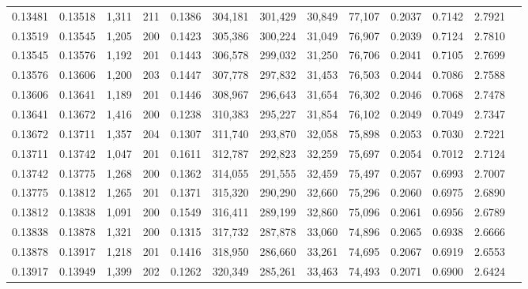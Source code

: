\begin{tabular}{rrrrrrrrrrrrr}
0.13481 & 0.13518 & 1,311 & 211 &                                     0.1386 & 304,181 & 301,429 &  30,849 &  77,107 & 0.2037 & 0.7142 & 2.7921 \\
0.13519 & 0.13545 & 1,205 & 200 &                                     0.1423 & 305,386 & 300,224 &  31,049 &  76,907 & 0.2039 & 0.7124 & 2.7810 \\
0.13545 & 0.13576 & 1,192 & 201 &                                     0.1443 & 306,578 & 299,032 &  31,250 &  76,706 & 0.2041 & 0.7105 & 2.7699 \\
0.13576 & 0.13606 & 1,200 & 203 &                                     0.1447 & 307,778 & 297,832 &  31,453 &  76,503 & 0.2044 & 0.7086 & 2.7588 \\
0.13606 & 0.13641 & 1,189 & 201 &                                     0.1446 & 308,967 & 296,643 &  31,654 &  76,302 & 0.2046 & 0.7068 & 2.7478 \\
0.13641 & 0.13672 & 1,416 & 200 &                                     0.1238 & 310,383 & 295,227 &  31,854 &  76,102 & 0.2049 & 0.7049 & 2.7347 \\
0.13672 & 0.13711 & 1,357 & 204 &                                     0.1307 & 311,740 & 293,870 &  32,058 &  75,898 & 0.2053 & 0.7030 & 2.7221 \\
0.13711 & 0.13742 & 1,047 & 201 &                                     0.1611 & 312,787 & 292,823 &  32,259 &  75,697 & 0.2054 & 0.7012 & 2.7124 \\
0.13742 & 0.13775 & 1,268 & 200 &                                     0.1362 & 314,055 & 291,555 &  32,459 &  75,497 & 0.2057 & 0.6993 & 2.7007 \\
0.13775 & 0.13812 & 1,265 & 201 &                                     0.1371 & 315,320 & 290,290 &  32,660 &  75,296 & 0.2060 & 0.6975 & 2.6890 \\
0.13812 & 0.13838 & 1,091 & 200 &                                     0.1549 & 316,411 & 289,199 &  32,860 &  75,096 & 0.2061 & 0.6956 & 2.6789 \\
0.13838 & 0.13878 & 1,321 & 200 &                                     0.1315 & 317,732 & 287,878 &  33,060 &  74,896 & 0.2065 & 0.6938 & 2.6666 \\
0.13878 & 0.13917 & 1,218 & 201 &                                     0.1416 & 318,950 & 286,660 &  33,261 &  74,695 & 0.2067 & 0.6919 & 2.6553 \\
0.13917 & 0.13949 & 1,399 & 202 &                                     0.1262 & 320,349 & 285,261 &  33,463 &  74,493 & 0.2071 & 0.6900 & 2.6424 \\

\end{tabular}

